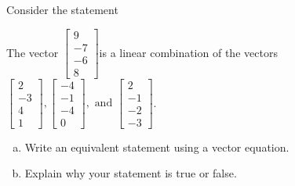 
\begin{exerciseStatement}


Consider the statement 
\begin{center}\begin{minipage}{0.8\textwidth}
 The vector \( \left[\begin{array}{c}
9 \\
-7 \\
-6 \\
8
\end{array}\right] \)is a linear combination of the vectors \( \left[\begin{array}{c}
2 \\
-3 \\
4 \\
1
\end{array}\right] , \left[\begin{array}{c}
-4 \\
-1 \\
-4 \\
0
\end{array}\right] , \text{ and } \left[\begin{array}{c}
2 \\
-1 \\
-2 \\
-3
\end{array}\right] \). 
\end{minipage}\end{center}
    


\begin{enumerate}[(a)]
\item  Write an equivalent statement using a vector equation.
\item  Explain why your statement is true or false.
\end{enumerate}
    
\end{exerciseStatement}
    
